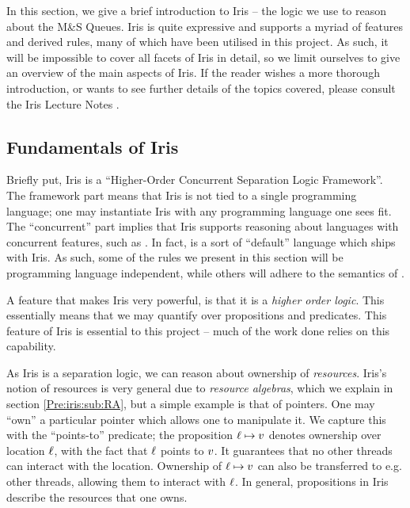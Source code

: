\documentclass[a4paper, 10pt]{report}
\theoremstyle{definition}
\newcommand{\msq}{M\&S Queue}
\begin{document}
In this section, we give a brief introduction to Iris -- the logic we use to reason about the \msq{}s. Iris is quite expressive and supports a myriad of features and derived rules, many of which have been utilised in this project. As such, it will be impossible to cover all facets of Iris in detail, so we limit ourselves to give an overview of the main aspects of Iris. If the reader wishes a more thorough introduction, or wants to see further details of the topics covered, please consult the Iris Lecture Notes \citep{gentleiris}.

\subsection{Fundamentals of Iris}
Briefly put, Iris is a \enquote{Higher-Order Concurrent Separation Logic Framework}. The framework part means that Iris is not tied to a single programming language; one may instantiate Iris with any programming language one sees fit. The ``concurrent'' part implies that Iris supports reasoning about languages with concurrent features, such as \heaplang. In fact, \heaplang is a sort of ``default'' language which ships with Iris. As such, some of the rules we present in this section will be programming language independent, while others will adhere to the semantics of \heaplang.

A feature that makes Iris very powerful, is that it is a \textit{higher order logic}. This essentially means that we may quantify over propositions and predicates. This feature of Iris is essential to this project -- much of the work done relies on this capability.

As Iris is a separation logic, we can reason about ownership of \textit{resources}. Iris's notion of resources is very general due to \textit{resource algebras}, which we explain in section \ref{Pre:iris:sub:RA}, but a simple example is that of pointers. One may ``own'' a particular pointer which allows one to manipulate it. We capture this with the ``points-to'' predicate; the proposition $\ell \mapsto v$ denotes ownership over location $\ell$, with the fact that $\ell$ points to $v$. It guarantees that no other threads can interact with the location. Ownership of $\ell \mapsto v$ can also be transferred to e.g. other threads, allowing them to interact with $\ell$. In general, propositions in Iris describe the resources that one owns.
\end{document}
